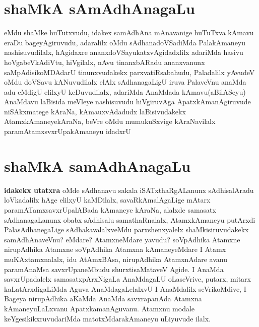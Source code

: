 \section*{shaMkA sAmAdhAnagaLu}
\begin{artha}
eMdu shaMke huTutxvudu, idakex samAdhAna mAnavanige huTuTxva kAmavu eraDu bageyAgiruvudu, adaralilx oMdu sAdhanadoVSadiMda PalakAmaneyu nashisuvudilalx, hAgidaxre ananxdoVSayukatxvAgidadxlilx adariMda hasivu hoVgabeVkAdiVtu, hiVgilalx, nAvu tinanxbARadu ananxvanunx saMpAdisikoMDAdarU tinunxvudakekx parxvatiRsabahudu, Paladalilx yAvudeV oMdu doVSavu kANuvudilalx elAlx sAdhanagaLigU iruva PalaveVnu anaMda adu eMdigU elilxyU keDuvudilalx, adariMda AnaMdada kAmavu(aBilASeyu) AnaMdavu laBisida meVleye nashisuvudu hiVgiruvAga ApatxkAmanAgiruvude niSAkxmatege kAraNa, kAmauxvAdadudx laBisivudakekx AtamxkAmaneyekAraNa, beVre oMdu mumukuSxvige kAraNavilalx paramAtamxsvxrUpakAmaneyu idadxrU  
\end{artha}

\section*{shaMkA samAdhAnagaLu} 

\begin{artha}
\textbf{idakekx utatxra} oMde sAdhanavu sakala iSATxthaRgALanunx sAdhisalAradu loVkadalilx hAge elilxyU kaMDilalx, savaRkAmalAgaLige mAtarx paramATamxsavxrUpalABada kAmaneye kAraNa, alalxde samasatx sAdhanagaLanunx obabx sAdhisalu samathaRnalalx, AtamxkAmaneyu putArxdi PalasAdhanegaLige sAdhakavalalxveMdu parxshenxyalelx shaMkisiruvudakekx samAdhAnaveVnu? eMdare? AtamxneMdare yavudu? soVpAdhika Atamxne nirupAdhika Atamxne soVpAdhika Atamxna kAmaneyeMdare I Atamx muKAxtamxnalalx, idu AtAmxBAsa, nirupAdhika AtamxnAdare avanu paramAnaMsa savxrUpaneMbudu shurxtisaMataveV Agide. I AnaMda savxrUpadalelx samasatxpArxNigaLa AnaMdagaLU oLaseVrive, putarx, mitarx kaLatArxdigaLiMda Aguva AnaMdagaLelalxvU I AnaMdalilx seVrikoMdive, I Bageya nirupAdhika aKaMda AnaMda savxrapanAda Atamxna kAmaneyuLaLxvanu ApatxkamanAguvanu. Atamxnu modale keYgesikikxruvudariMda matotxMdarakAmaneyu uLiyuvude ilalx.
\end{artha}

